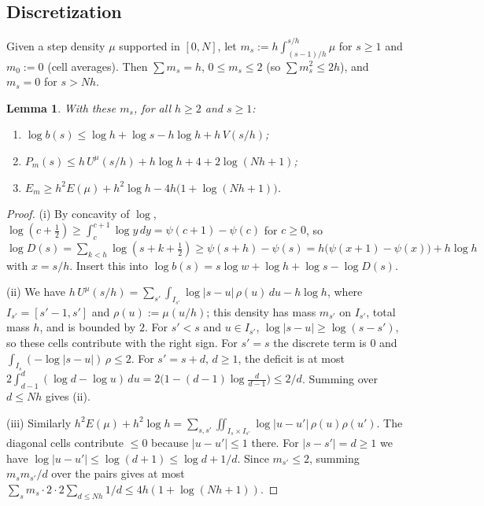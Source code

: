 \documentclass[11pt]{amsart}
\newtheorem{lemma}[theorem]{Lemma}
\theoremstyle{definition}
\theoremstyle{remark}
\numberwithin{equation}{section}
\begin{document}
\subsection{Discretization}
Given a step density $\mu$ supported in $[0,N]$, let $m_s:=h\int_{(s-1)/h}^{s/h}\mu$ for $s\ge1$ and $m_0:=0$ (cell
averages). Then $\sum m_s=h$, $0\le m_s\le2$ (so $\sum m_s^2\le2h$), and $m_s=0$ for $s>Nh$.

\begin{lemma}\label{lem:discrete}
With these $m_s$, for all $h\ge2$ and $s\ge1$:
\begin{enumerate}
\item $\log b(s)\le\log h+\log s-h\log h+h\,V(s/h)$;
\item $P_m(s)\le h\,U^\mu(s/h)+h\log h+4+2\log(Nh+1)$;
\item $E_m\ge h^2E(\mu)+h^2\log h-4h\bigl(1+\log(Nh+1)\bigr)$.
\end{enumerate}
\end{lemma}

\begin{proof}
(i) By concavity of $\log$, $\log(c+\frac12)\ge\int_c^{c+1}\log y\,dy=\psi(c+1)-\psi(c)$ for $c\ge0$, so
$\log D(s)=\sum_{k<h}\log(s+k+\frac12)\ge\psi(s+h)-\psi(s)=h\bigl(\psi(x+1)-\psi(x)\bigr)+h\log h$ with $x=s/h$. Insert this into
$\log b(s)=s\log w+\log h+\log s-\log D(s)$.

(ii) We have $h\,U^\mu(s/h)=\sum_{s'}\int_{I_{s'}}\log|s-u|\,\rho(u)\,du-h\log h$, where $I_{s'}=[s'-1,s']$ and
$\rho(u):=\mu(u/h)$; this density has mass $m_{s'}$ on $I_{s'}$, total mass $h$, and is bounded by $2$. For
$s'<s$ and $u\in I_{s'}$, $\log|s-u|\ge\log(s-s')$, so these cells contribute with the right sign. For $s'=s$ the
discrete term is $0$ and $\int_{I_s}(-\log|s-u|)\,\rho\le2$. For $s'=s+d$, $d\ge1$, the deficit is at most
$2\int_{d-1}^{d}(\log d-\log u)\,du=2\bigl(1-(d-1)\log\tfrac d{d-1}\bigr)\le2/d$. Summing over $d\le Nh$ gives (ii).

(iii) Similarly $h^2E(\mu)+h^2\log h=\sum_{s,s'}\iint_{I_s\times I_{s'}}\log|u-u'|\,\rho(u)\rho(u')$. The diagonal cells
contribute $\le0$ because $|u-u'|\le1$ there. For $|s-s'|=d\ge1$ we have $\log|u-u'|\le\log(d+1)\le\log d+1/d$. Since $m_{s'}\le2$, summing
$m_sm_{s'}/d$ over the pairs gives at most $\sum_sm_s\cdot2\cdot2\sum_{d\le Nh}1/d\le4h(1+\log(Nh+1))$.
\end{proof}
\end{document}

